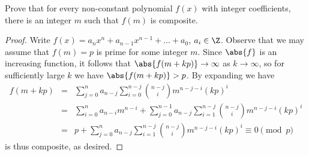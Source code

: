 \documentclass[10pt]{amsart}
\begin{document}
\begin{thm}\label{ex5}
  Prove that for every non-constant polynomial $f(x)$ with integer coefficients, there is an integer $m$ such that $f(m)$ is composite.
  
  \begin{proof}
    Write $f(x) = a_nx^n + a_{n-1}x^{n-1} + \ldots + a_0$, $a_i \in \Z$. 
    Observe that we may assume that $f(m) = p$ is prime for some integer $m$.
    Since $\abs{f}$ is an increasing function, it follows that $\abs{f(m + kp)} \rightarrow \infty$ as $k \rightarrow \infty$, so for sufficiently large $k$ we have $\abs{f(m + kp)} > p$.
    By expanding we have
    \begin{eqnarray*}
      f(m + kp) &=& \sum_{j=0}^{n}a_{n-j}\sum_{i=0}^{n-j} {n-j \choose i}m^{n-j-i}(kp)^i\\
      &=& \sum_{i=0}^n a_{n-i}m^{n-i} + \sum_{j=0}^{n-1}a_{n-j}\sum_{i=1}^{n-j} {n-j \choose i}m^{n-j-i}(kp)^i\\
      &=& p + \sum_{j=0}^{n}a_{n-j}\sum_{i=1}^{n-j} {n-j \choose i}m^{n-j-i}(kp)^i \equiv 0 \pmod{p}
      \end{eqnarray*}
    is thus composite, as desired.
  \end{proof}
\end{thm}
\end{document}
